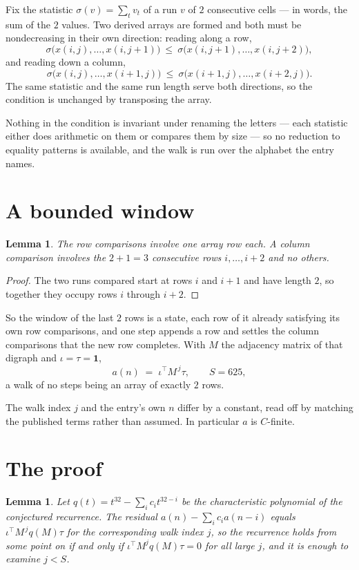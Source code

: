 \documentclass[11pt,a4paper]{article}
\theoremstyle{plain}
\newtheorem{lemma}[theorem]{Lemma}
\theoremstyle{definition}
\begin{document}
Fix the statistic $\sigma(v)=\sum_{t} v_t$ of a run $v$ of $2$ consecutive cells --- in words,
the sum of the $2$ values. Two derived arrays are formed and both must be
nondecreasing in their own direction: reading along a row,
\[
\sigma\bigl(x(i,j),\dots,x(i,j{+}1)\bigr)\ \le\
\sigma\bigl(x(i,j{+}1),\dots,x(i,j{+}2)\bigr),
\]
and reading down a column,
\[
\sigma\bigl(x(i,j),\dots,x(i{+}1,j)\bigr)\ \le\
\sigma\bigl(x(i{+}1,j),\dots,x(i{+}2,j)\bigr).
\]
The same statistic and the same run length serve both directions, so the condition is
unchanged by transposing the array.

Nothing in the condition is invariant under renaming the letters --- each statistic either does
arithmetic on them or compares them by size --- so no reduction to equality patterns is
available, and the walk is run over the alphabet the entry names.

\section{A bounded window}

\begin{lemma}\label{lem:win}
The row comparisons involve one array row each. A column comparison involves the
$2+1=3$ consecutive rows $i,\dots,i{+}2$ and no others.
\end{lemma}

\begin{proof}
The two runs compared start at rows $i$ and $i+1$ and have length $2$, so together they
occupy rows $i$ through $i+2$.
\end{proof}

So the window of the last $2$ rows is a state, each row of it already satisfying its own row
comparisons, and one step appends a row and settles the column comparisons that the new row
completes. With $M$ the adjacency matrix of that digraph and $\iota=\tau=\mathbf{1}$,
\[
a(n)\;=\;\iota^{\!\top}M^{\,j}\tau ,\qquad S=625,
\]
a walk of no steps being an array of exactly $2$ rows.

The walk index $j$ and the entry's own $n$ differ by a constant, read off by matching the
published terms rather than assumed. In particular $a$ is $C$-finite.

\section{The proof}

\begin{lemma}\label{lem:crit}
Let $q(t)=t^{32}-\sum_i c_it^{32-i}$ be the characteristic polynomial of the
conjectured recurrence. The residual $a(n)-\sum_ic_ia(n-i)$ equals
$\iota^{\!\top}M^{\,j}q(M)\tau$ for the corresponding walk index $j$, so the recurrence
holds from some point on if and only if $\iota^{\!\top}M^{j}q(M)\tau=0$ for all large $j$,
and it is enough to examine $j<S$.
\end{lemma}
\end{document}
